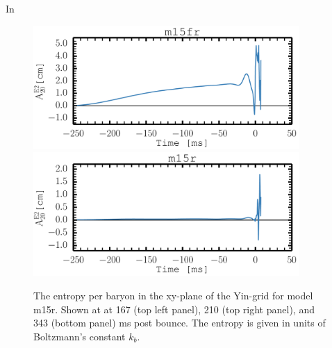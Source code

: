 In 
\begin{figure}[ht]         
\centering                            
\includegraphics[width=0.9\textwidth]{./images/paper2/bounce_fr.pdf} \\
\includegraphics[width=0.9\textwidth]{./images/paper2/bounce_r.pdf}
\caption{The entropy per baryon in the xy-plane of the Yin-grid for model m15r. Shown at
at 167 (top left panel), 210 (top right panel), and 343 (bottom panel) ms post bounce. 
The entropy is given in units of Boltzmann's constant $k_b$. \label{figp2:bounce}}
\end{figure}


